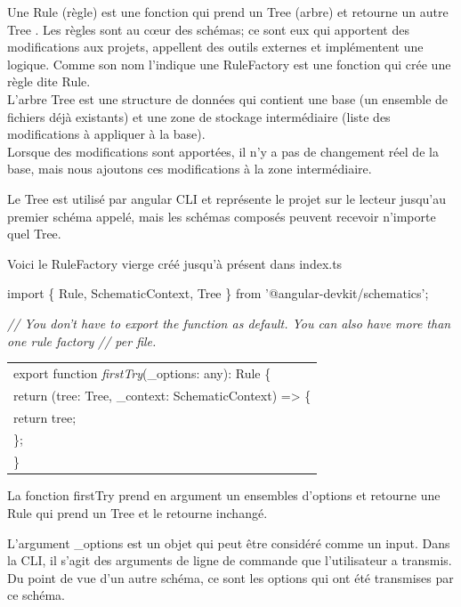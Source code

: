 \documentclass[12pt,french]{article}
\begin{document}
	Une Rule (règle) est une fonction qui prend un Tree (arbre) et retourne un autre Tree . Les règles sont au cœur des schémas; ce sont eux qui apportent des modifications aux projets, appellent des outils externes et implémentent une logique. Comme son nom l'indique une RuleFactory est une fonction qui crée une règle dite Rule.\\
	L'arbre Tree est une structure de données qui contient une base (un ensemble de fichiers déjà existants) et une zone de stockage intermédiaire (liste des modifications à appliquer à la base).\\
	Lorsque des modifications sont apportées, il n'y a pas de changement réel de la base, mais nous ajoutons ces modifications à la zone intermédiaire.\newline
	
	Le Tree est utilisé par angular CLI et représente le projet sur le lecteur jusqu'au premier schéma appelé, mais les schémas composés peuvent recevoir n’importe quel Tree.\newline
	
	Voici le RuleFactory vierge créé jusqu'à présent dans index.ts\newline
	
	import \{ Rule, SchematicContext, Tree \} from '@angular-devkit/schematics';\newline
	
	\textit{// You don't have to export the function as default. You can also have more than one rule factory}\newline
	\textit{// per file.}\newline	
	\begin{tabular}{l}
		export function \textit{firstTry}(\_options: any): Rule \{\\
		\quad return (tree: Tree, \_context: SchematicContext) => \{\\
		\qquad return tree;\\
		\quad\};\\
		\}\\
	\end{tabular}\break

	La fonction firstTry prend en argument un ensembles d'options et retourne une Rule qui prend un Tree et le retourne inchangé.\newline
	
	L'argument \_options est un objet qui peut être considéré comme un input. Dans la CLI, il s'agit des arguments de ligne de commande que l'utilisateur a transmis. Du point de vue d'un autre schéma, ce sont les options qui ont été transmises par ce schéma.\newline
	
\end{document}
